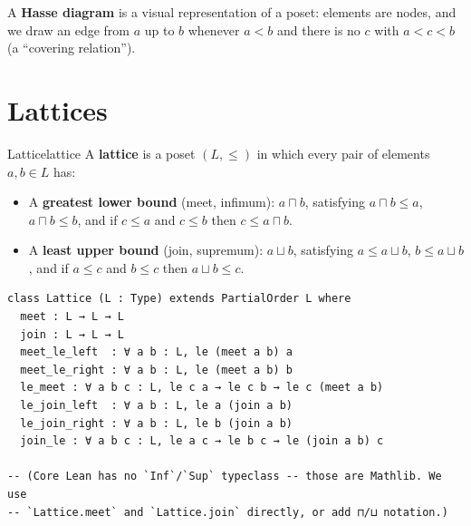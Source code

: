 \documentclass[11pt, a4paper, oneside]{book}
\begin{document}
A \textbf{Hasse diagram} is a visual representation of a poset: elements are
nodes, and we draw an edge from $a$ up to $b$ whenever $a < b$ and there is
no $c$ with $a < c < b$ (a ``covering relation'').

\begin{center}
\end{center}

\section{Lattices}

\begin{defn}{Lattice}{lattice}
A \textbf{lattice} is a poset $(L, \leq)$ in which every pair of elements
$a, b \in L$ has:
\begin{itemize}[nosep]
\item A \textbf{greatest lower bound} (meet, infimum): $a \sqcap b$, satisfying
  $a \sqcap b \leq a$, $a \sqcap b \leq b$, and if $c \leq a$ and $c \leq b$
  then $c \leq a \sqcap b$.
\item A \textbf{least upper bound} (join, supremum): $a \sqcup b$, satisfying
  $a \leq a \sqcup b$, $b \leq a \sqcup b$, and if $a \leq c$ and $b \leq c$
  then $a \sqcup b \leq c$.
\end{itemize}
\end{defn}

\begin{leanbox}
\begin{verbatim}
class Lattice (L : Type) extends PartialOrder L where
  meet : L → L → L
  join : L → L → L
  meet_le_left  : ∀ a b : L, le (meet a b) a
  meet_le_right : ∀ a b : L, le (meet a b) b
  le_meet : ∀ a b c : L, le c a → le c b → le c (meet a b)
  le_join_left  : ∀ a b : L, le a (join a b)
  le_join_right : ∀ a b : L, le b (join a b)
  join_le : ∀ a b c : L, le a c → le b c → le (join a b) c

-- (Core Lean has no `Inf`/`Sup` typeclass -- those are Mathlib. We use
-- `Lattice.meet` and `Lattice.join` directly, or add ⊓/⊔ notation.)
\end{verbatim}
\end{leanbox}
\end{document}
